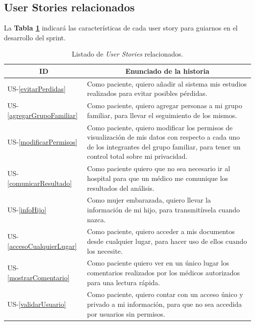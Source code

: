 \subsection{User Stories relacionados}
La \textbf{Tabla \ref{US-Sprint9}} indicará las características de cada user story para guiarnos en el desarrollo del sprint.

\begin{table}[h]
    \centering
	\begin{tabular}{|l|p{9cm}|}
	\hline
        \multicolumn{1}{|c|}{\textbf{ID}} &
        \multicolumn{1}{|c|}{\textbf{Enunciado de la historia}} \\          
    \hline
        US-\ref{evitarPerdidas} &
        Como paciente, quiero  añadir al sistema mis estudios realizados para evitar posibles pérdidas.\\
    \hline
       	US-\ref{agregarGrupoFamiliar} &
       	Como paciente, quiero agregar personas a mi grupo familiar, para llevar el seguimiento de los mismos. \\
    \hline
       	US-\ref{modificarPermisos} &
       	Como paciente, quiero modificar los permisos de visualización de mis datos con respecto a cada uno de los integrantes del grupo familiar, para tener un control total sobre mi privacidad. \\
    \hline 
        US-\ref{comunicarResultado} &
        Como paciente quiero que no sea necesario ir al hospital para que un médico me comunique los resultados del análisis.\\
    \hline
       	US-\ref{infoHijo} &
       	Como mujer embarazada, quiero llevar la información de mi hijo, para transmitírsela cuando nazca. \\
    \hline
    	US-\ref{accesoCualquierLugar} &
    	Como paciente, quiero acceder a mis documentos desde cualquier lugar, para hacer uso de ellos cuando los necesite. \\
    \hline
        US-\ref{mostrarComentario} &
        Como paciente quiero ver en un único lugar los comentarios realizados por los médicos autorizados para una lectura rápida.\\
    \hline     
        US-\ref{validarUsuario} &
        Como paciente, quiero contar con un acceso único y privado a mi información, para que no sea accedida por usuarios sin permisos.\\
    \hline
    \end{tabular}
    \caption{Listado de \textit{User Stories} relacionados.}
    \label{US-Sprint9}
\end{table}

